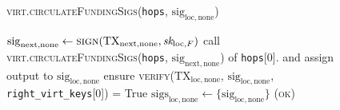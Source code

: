 \begin{figure}[H]
\begin{processbox}{\textsc{virt.circulateFundingSigs}(\texttt{hops},
      $\mathrm{sig}_{\mathrm{loc}, \mathrm{none}}$)}
\begin{algorithmic}[1]
      \Else \: 
        \State $\mathrm{sig}_{\mathrm{next}, \mathrm{none}} \gets
        \textsc{sign}(\mathrm{TX}_{\mathrm{next}, \mathrm{none}},
        \textit{sk}_{\mathrm{loc}, F})$
        \State call \textsc{virt.circulateFundingSigs}(\texttt{hops},
        $\mathrm{sig}_{\mathrm{next}, \mathrm{none}}$) of \texttt{hops}[0].\bob
        and assign output to $\mathrm{sig}_{\mathrm{loc}, \mathrm{none}}$
        \State ensure \textsc{verify}($\mathrm{TX}_{\mathrm{loc},
        \mathrm{none}}$, $\mathrm{sig}_{\mathrm{loc}, \mathrm{none}}$,
        \texttt{right\_virt\_keys}[0]) = True
        \State $\mathrm{sigs}_{\mathrm{loc}, \mathrm{none}} \gets \{
        \mathrm{sig}_{\mathrm{loc}, \mathrm{none}} \}$
        \State \Return (\textsc{ok})
      \EndIf
    \end{algorithmic}
  \end{processbox}
  \caption{}
  \label{code:virtual-layer:funding-sigs}
\end{figure}


